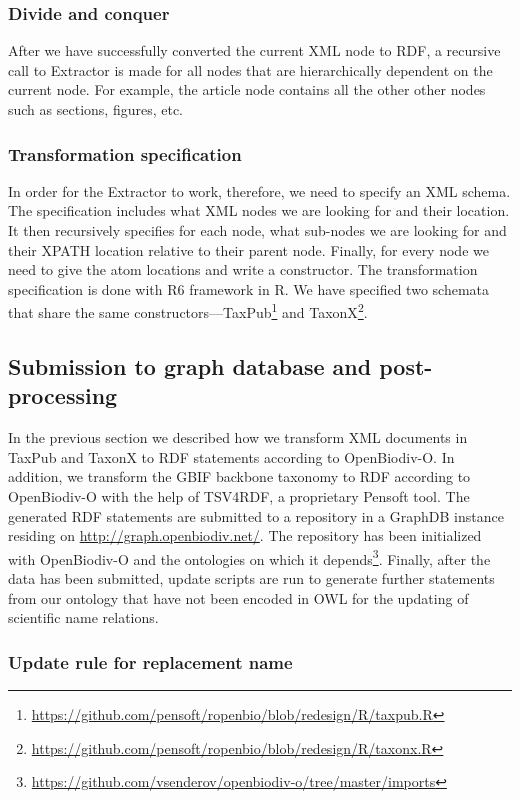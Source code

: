 \subsubsection{Divide and conquer}

After we have successfully converted the current XML node to RDF, a recursive call to Extractor is made for all nodes that are hierarchically dependent on the current node. For example, the article node contains all the other other nodes such as sections, figures, etc.

\subsubsection{Transformation specification}

In order for the Extractor to work, therefore, we need to specify an XML schema. The specification includes what XML nodes we are looking for and their location. It then recursively specifies for each node, what sub-nodes we are looking for and their XPATH location relative to their parent node. Finally, for every node we need to give the atom locations and write a constructor. The transformation specification is done with R6 framework in R. We have specified two schemata that share the same constructors---TaxPub\footnote{\url{https://github.com/pensoft/ropenbio/blob/redesign/R/taxpub.R}} and TaxonX\footnote{\url{https://github.com/pensoft/ropenbio/blob/redesign/R/taxonx.R}}.

\subsection{Submission to graph database and post-processing}

In the previous section we described how we transform XML documents in TaxPub and TaxonX to RDF statements according to OpenBiodiv-O. In addition, we transform the GBIF backbone taxonomy to RDF according to OpenBiodiv-O with the help of TSV4RDF, a proprietary Pensoft tool. The generated RDF statements are submitted to a repository in a GraphDB instance residing on \url{http://graph.openbiodiv.net/}. The repository has been initialized with OpenBiodiv-O and the ontologies on which it depends\footnote{\url{https://github.com/vsenderov/openbiodiv-o/tree/master/imports}}. Finally, after the data has been submitted, update scripts are run to generate further statements from our ontology that have not been encoded in OWL for the updating of scientific name relations.

\subsubsection{Update rule for replacement name}

